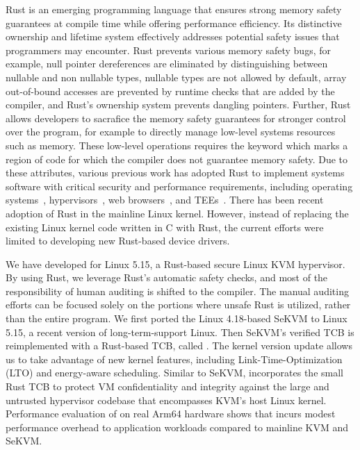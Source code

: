 Rust is an emerging programming language that ensures strong memory safety
guarantees at compile time while offering performance efficiency.
Its distinctive ownership and lifetime system
effectively addresses potential safety issues that programmers may encounter.
Rust prevents various memory safety bugs, for example, null pointer
dereferences are eliminated by distinguishing between nullable and non
nullable types, nullable types are not allowed by default, array out-of-bound
accesses are prevented by runtime checks that are added by the compiler, and
Rust's ownership system prevents dangling pointers.
Further, Rust allows developers to
sacrafice the memory safety guarantees for stronger control over the program,
for example to directly manage low-level systems resources such as memory.
These low-level operations requires the  keyword which marks a
region of code for which the compiler does not guarantee memory safety.
Due to these
attributes, various previous work has adopted Rust to implement systems
software with critical security and performance requirements, including
operating systems~\cite{NrOS, Redleaf, TockOS, theseus},
hypervisors~\cite{DuVisor, RustyHermit}, web browsers~\cite{servo},
and TEEs~\cite{rustsgx,rustee}.
There has been recent adoption of Rust in the mainline Linux kernel. However,
instead of replacing the existing Linux kernel code written in C with Rust,
the current efforts were limited to developing new Rust-based device drivers.

We have developed \rustsec{} for Linux 5.15, a Rust-based secure Linux KVM hypervisor.
By using Rust, we leverage Rust's automatic safety checks, and most of the
responsibility of human auditing is shifted to the compiler. The manual
auditing efforts can be focused solely on the portions where unsafe Rust is
utilized, rather than the entire program.
We first ported the Linux 4.18-based SeKVM to Linux 5.15, a recent version of long-term-support Linux.
Then SeKVM's verified TCB is reimplemented with a Rust-based TCB, called \rustcore{}.
The kernel version update allows us to take advantage of new kernel features, including Link-Time-Optimization (LTO) and energy-aware scheduling.
Similar to SeKVM, \rustsec{} incorporates the small Rust TCB \rustcore{} to
protect VM confidentiality and integrity against the large and untrusted
hypervisor codebase that encompasses KVM's host Linux kernel.
Performance evaluation of \rustsec{} on real Arm64 hardware shows that
\rustsec{} incurs modest performance overhead to application workloads
compared to mainline KVM and SeKVM.

